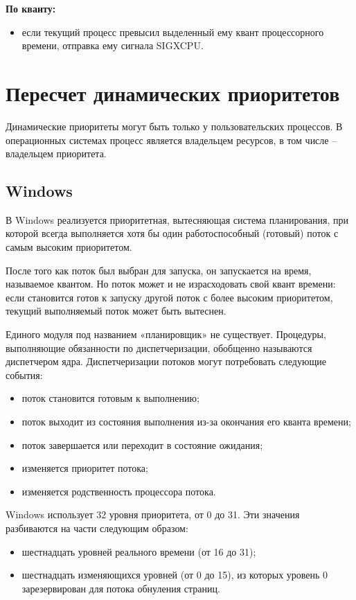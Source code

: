 \documentclass[a4paper, 12pt]{extreport}
\begin{document}
\textbf{По кванту:}
\begin{itemize}
	\item если текущий процесс превысил выделенный ему квант процессорного времени, отправка ему сигнала SIGXCPU.
\end{itemize}

\clearpage

\chapter{Пересчет динамических приоритетов}

Динамические приоритеты могут быть только у пользовательских процессов. В операционных системах процесс является 
владельцем ресурсов, в том числе -- владельцем приоритета.

\section{Windows}

В Windows реализуется приоритетная, вытесняющая система планирования, при  которой всегда выполняется хотя бы один 
работоспособный (готовый) поток с самым высоким приоритетом. 

После того как поток был выбран для запуска, он запускается на время, называемое квантом. Но поток может и не 
израсходовать свой квант времени: если становится готов к запуску другой поток с более высоким приоритетом, текущий 
выполняемый поток может быть вытеснен.

Единого модуля под названием «планировщик» не существует. Процедуры, выполняющие обязанности по диспетчеризации, 
обобщенно называются диспетчером ядра. Диспетчеризации потоков могут потребовать следующие события:

\begin{itemize}
	\item поток становится готовым к выполнению;
	\item поток выходит из состояния выполнения из-за окончания его кванта времени;
	\item поток завершается или переходит в состояние ожидания;
	\item изменяется приоритет потока;
	\item изменяется родственность процессора потока.
\end{itemize}

Windows использует 32 уровня приоритета, от 0 до 31. Эти значения разбиваются на части следующим образом:
\begin{itemize}
	\item шестнадцать уровней реального времени (от 16 до 31);
	\item шестнадцать изменяющихся уровней (от 0 до 15), из которых уровень 0 зарезервирован для потока обнуления 
	страниц. 
\end{itemize}
 
\end{document}
